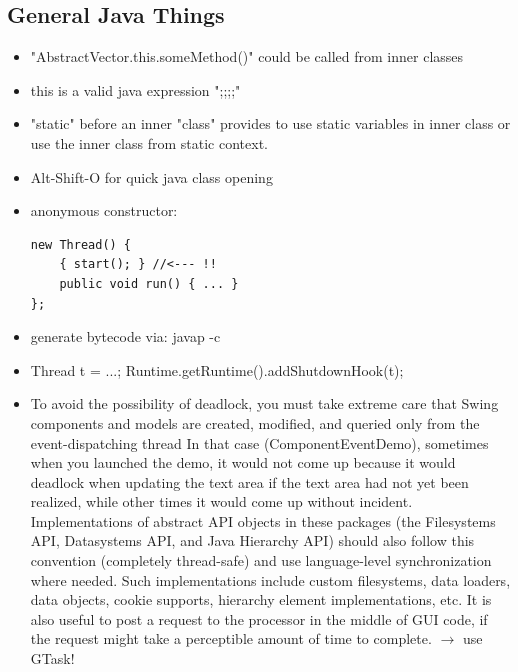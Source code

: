 \documentclass[12pt]{article}
\begin{document}
\subsection{General Java Things}
\begin{itemize}
\item "AbstractVector.this.someMethod()" could be called from inner classes\\
\item this is a valid java expression ";;;;"\\
\item "static" before an inner "class" provides to use static variables in inner class or use the inner class from static context.
\item Alt-Shift-O for quick java class opening
\item anonymous constructor:
\begin{verbatim}
new Thread() {
    { start(); } //<--- !!
    public void run() { ... }
};
\end{verbatim}
\item generate bytecode via: javap -c
\item Thread t = ...; Runtime.getRuntime().addShutdownHook(t);
\item To avoid the possibility of deadlock, you must take extreme care that Swing components and models are created, modified, and queried only from the event-dispatching thread In that case (ComponentEventDemo), sometimes when you launched the demo, it would not come up because it would deadlock when updating the text area if the text area had not yet been realized, while other times it would come up without incident. Implementations of abstract API objects in these packages (the Filesystems API, Datasystems API, and Java Hierarchy API) should also follow this convention (completely thread-safe) and use language-level synchronization where needed. Such implementations include custom filesystems, data loaders, data objects, cookie supports, hierarchy element implementations, etc. It is also useful to post a request to the processor in the middle of GUI code, if the request might take a perceptible amount of time to complete. $\rightarrow$ use GTask!
\end{itemize}
\end{document}
